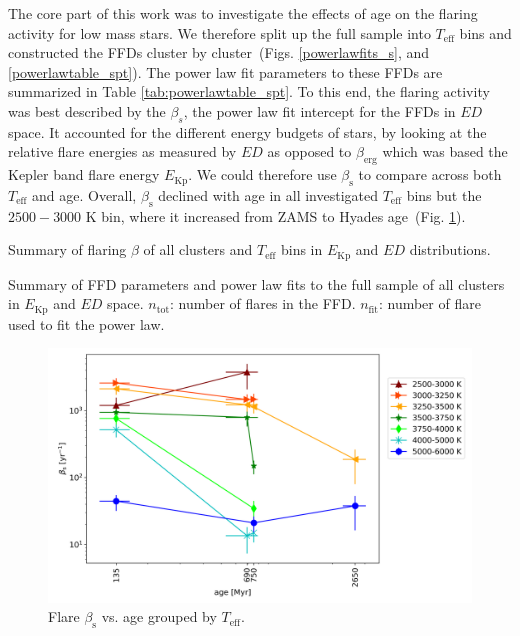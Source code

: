 \documentclass{aa}
\begin{document}
The core part of this work was to investigate the effects of age on the flaring activity for low mass stars. We therefore split up the full sample into $T_\mathrm{eff}$ bins and constructed the FFDs cluster by cluster~(Figs. \ref{powerlawfits_s}, and \ref{powerlawtable_spt}). The power law fit parameters to these FFDs are summarized in Table \ref{tab:powerlawtable_spt}. To this end, the flaring activity was best described by the $\beta_s$, the power law fit intercept for the FFDs in $ED$ space. It accounted for the different energy budgets of stars, by looking at the relative flare energies as measured by $ED$ as opposed to $\beta_\mathrm{erg}$ which was based the Kepler band flare energy $E_\mathrm{Kp}$. We could therefore use $\beta_\mathrm{s}$ to compare across both $T_\mathrm{eff}$ and age. Overall, $\beta_\mathrm{s}$ declined with age in all investigated $T_\mathrm{eff}$ bins but the $2500-3000$ K bin, where it increased from ZAMS to Hyades age~(Fig. \ref{fig:beta_T_age}). 


\begin{table}
\caption{Summary of flaring $\beta$ of all clusters and $T_\mathrm{eff}$ bins in $E_\mathrm{Kp}$ and $ED$ distributions.}\label{tab:powerlawtable_spt}
\centering

\end{table}

\begin{table}
\caption{Summary of FFD parameters and power law fits to the full sample of all clusters in $E_\mathrm{Kp}$ and $ED$ space. $n_\mathrm{tot}$: number of flares in the FFD. $n_\mathrm{fit}$: number of flare used to fit the power law.}\label{tab:powerlawtable_fullsample}
\centering

\end{table}

\begin{figure}
    \centering
    \includegraphics[width=13.5cm]{pics/FFDs/beta_T_age_ED_wheatland.png}
    \caption{Flare $\beta_\mathrm{s}$ vs. age grouped by $T_\mathrm{eff}$.}          	
    \label{fig:beta_T_age}
\end{figure}
\end{document}
